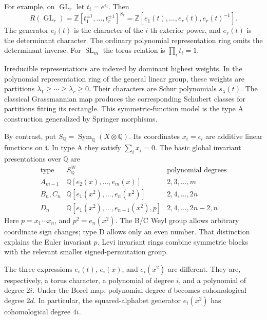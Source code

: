 \documentclass[11pt,letterpaper]{article}
\newcommand{\Z}{\mathbb Z}\newcommand{\Q}{\mathbb Q}\newcommand{\C}{\mathbb C}
\newcommand{\Sym}{\operatorname{Sym}}\newcommand{\Rep}{\operatorname{Rep}}
\newcommand{\SL}{\operatorname{SL}}\newcommand{\GL}{\operatorname{GL}}
\newcommand{\eps}{\epsilon}\newcommand{\poly}{\mathrm{poly}}
\theoremstyle{definition}\newtheorem{definition}[theorem]{Definition}
\begin{document}
For example, on \(\GL_r\) let \(t_i=e^{\eps_i}\). Then
\[
 R(\GL_r)=
 \Z[t_1^{\pm1},\ldots,t_r^{\pm1}]^{S_r}
 =\Z[e_1(t),\ldots,e_r(t),e_r(t)^{-1}].
 \tag{4}
\]
The generator \(e_i(t)\) is the character of the \(i\)-th exterior
power, and \(e_r(t)\) is the determinant character. The ordinary
polynomial representation ring omits the determinant inverse.
For \(\SL_m\) the torus relation is \(\prod_i t_i=1\).

Irreducible representations are indexed by dominant highest weights.
In the polynomial representation ring of the general linear group,
these weights are partitions \(\lambda_1\ge\cdots\ge\lambda_r\ge0\).
Their characters are Schur polynomials \(s_\lambda(t)\).
The classical Grassmannian map produces the corresponding Schubert
classes for partitions fitting its rectangle. This symmetric-function
model is the type A construction generalized by Springer morphisms.

By contrast, put \(S_\Q=\Sym_\Q(X\otimes\Q)\). Its coordinates
\(x_i=\eps_i\) are additive linear functions on \(\mathfrak t\).
In type A they satisfy \(\sum_i x_i=0\). The basic global invariant
presentations over \(\Q\) are
\[
\begin{array}{c|l|l}
\text{type}&S_\Q^W&\text{polynomial degrees}\\ \hline
A_{m-1}&\Q[e_2(x),\ldots,e_m(x)]&2,3,\ldots,m\\
B_n,C_n&\Q[e_1(x^2),\ldots,e_n(x^2)]&2,4,\ldots,2n\\
D_n&\Q[e_1(x^2),\ldots,e_{n-1}(x^2),p]&2,4,\ldots,2n-2,n
\end{array}
\tag{5}
\]
Here \(p=x_1\cdots x_n\), and \(p^2=e_n(x^2)\).
The B/C Weyl group allows arbitrary coordinate sign changes; type D
allows only an even number. That distinction explains the Euler
invariant \(p\). Levi invariant rings combine symmetric blocks with
the relevant smaller signed-permutation group.

The three expressions \(e_i(t)\), \(e_i(x)\), and \(e_i(x^2)\) are
different. They are, respectively, a torus character, a polynomial of
degree \(i\), and a polynomial of degree \(2i\). Under the Borel map,
polynomial degree \(d\) becomes cohomological degree \(2d\).
In particular, the squared-alphabet generator \(e_i(x^2)\)
has cohomological degree \(4i\).
\end{document}

